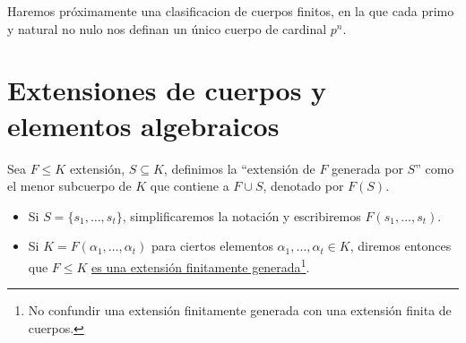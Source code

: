 \noindent
Haremos próximamente una clasificacion de cuerpos finitos, en la que cada primo y natural no nulo nos definan un único cuerpo de cardinal $p^n$.

\section{Extensiones de cuerpos y elementos algebraicos}

\begin{definicion}
    Sea $F\leq K$ extensión, $S\subseteq K$, definimos la ``extensión de $F$ generada por $S$'' como el menor subcuerpo de $K$ que contiene a $F\cup S$, denotado por $F(S)$.
    \begin{itemize}
        \item Si $S = \{s_1,\ldots,s_t\}$, simplificaremos la notación y escribiremos $F(s_1,\ldots,s_t)$.
        \item Si $K = F(\alpha_1, \ldots, \alpha_t)$ para ciertos elementos $\alpha_1, \ldots, \alpha_t\in K$, diremos entonces que $F\leq K$ \underline{es una extensión finitamente generada}\footnote{No confundir una extensión finitamente generada con una extensión finita de cuerpos.}.
    \end{itemize}
\end{definicion}


